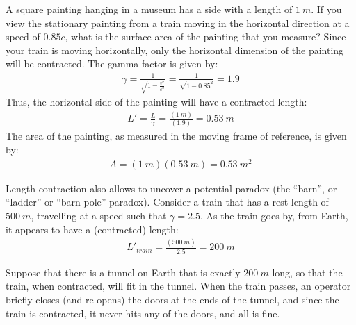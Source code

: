 \begin{example}{A square painting hanging in a museum has a side with a length of $\SI{1}{m}$. If you view the stationary painting from a train moving in the horizontal direction at a speed of $0.85c$, what is the surface area of the painting that you measure?}
Since your train is moving horizontally, only the horizontal dimension of the painting will be contracted. The gamma factor is given by:
\begin{align*}
\gamma = \frac{1}{\sqrt{1-\frac{v^2}{c^2}}} =\frac{1}{\sqrt{1-0.85^2}}=1.9
\end{align*}
Thus, the horizontal side of the painting will have a contracted length:
\begin{align*}
L'=\frac{L}{\gamma}=\frac{(\SI{1}{m})}{(1.9)}=\SI{0.53}{m}
\end{align*}
The area of the painting, as measured in the moving frame of reference, is given by:
\begin{align*}
A= (\SI{1}{m})(\SI{0.53}{m})=\SI{0.53}{m^2}
\end{align*}
\end{example}
Length contraction also allows to uncover a potential paradox (the ``barn'', or ``ladder'' or ``barn-pole'' paradox). Consider a train that has a rest length of $\SI{500}{m}$, travelling at a speed such that $\gamma = 2.5$. As the train goes by, from Earth, it appears to have a (contracted) length:
\begin{align*}
L'_{train}=\frac{(\SI{500}{m})}{2.5}=\SI{200}{m}
\end{align*}


Suppose that there is a tunnel on Earth that is exactly $\SI{200}{m}$ long, so that the train, when contracted, will fit in the tunnel. When the train passes, an operator briefly closes (and re-opens) the doors at the ends of the tunnel, and since the train is contracted, it never hits any of the doors, and all is fine.

